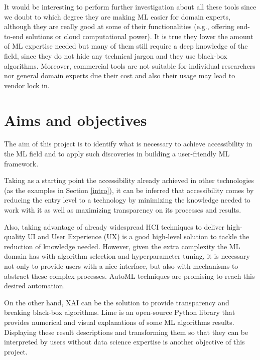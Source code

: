 \documentclass[runningheads]{llncs}
\begin{document}
It would be interesting to perform further investigation about all these tools since we doubt to which degree they are making ML easier for domain experts, although they are really good at some of their functionalities (e.g., offering end-to-end solutions or cloud computational power). It is true they lower the amount of ML expertise needed but many of them still require a deep knowledge of the field, since they do not hide any technical jargon and they use black-box algorithms. Moreover, commercial tools are not suitable for individual researchers nor general domain experts due their cost \cite{pennAI} and also their usage may lead to vendor lock in. 

\section{Aims and objectives}

The aim of this project is to identify what is necessary to achieve accessibility in the ML field and to apply such discoveries in building a user-friendly ML framework.

Taking as a starting point the accessibility already achieved in other technologies (as the examples in Section \ref{intro}), it can be inferred that accessibility comes by reducing the entry level to a technology by minimizing the knowledge needed to work with it as well as maximizing transparency on its processes and results. 

Also, taking advantage of already widespread HCI techniques to deliver high-quality UI and User Experience (UX) is a good high-level solution to tackle the reduction of knowledge needed.  However, given the extra complexity the ML domain has with algorithm selection and hyperparameter tuning, it is necessary not only to provide users with a nice interface, but also with mechanisms to abstract these complex processes. AutoML techniques are promising to reach this desired automation.

On the other hand, XAI can be the solution to provide transparency and breaking black-box algorithms. 
Lime \cite{lime} is an open-source Python library that provides numerical and visual explanations of some ML algorithms results. Displaying these result descriptions and transforming them so that they can be interpreted by users without data science expertise is another objective of this project.
\end{document}
